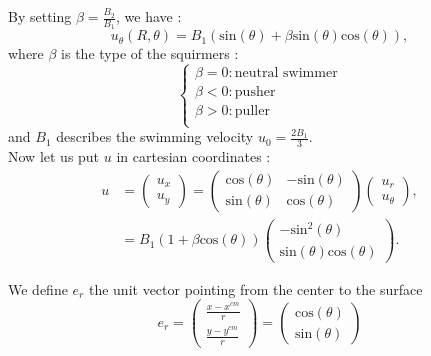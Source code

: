 \documentclass[options]{article}
\begin{document}
By setting $\beta=\frac{B_2}{B_1}$, we have :
$$
u_\theta(R,\theta) = B_1(\mathrm{sin}(\theta) + \beta \mathrm{sin}(\theta)\mathrm{cos}(\theta)),
$$
where $\beta$ is the type of the squirmers :
$$\left\{
    \begin{array}{ll}
        \beta = 0 : \text{neutral swimmer}  \\
        \beta < 0 : \mathrm{pusher} \\
        \beta > 0 : \mathrm{puller} \\
    \end{array}
\right.$$
and $B_1$ describes the swimming velocity $u_0 = \frac{2 B_1}{3}$.
\\ Now let us put $u$ in cartesian coordinates :
\begin{align*}
    u &= \begin{pmatrix}
   u_x \\
   u_y
\end{pmatrix}
= \begin{pmatrix}
   \mathrm{cos}(\theta) & -\mathrm{sin}(\theta) \\
   \mathrm{sin}(\theta) & \mathrm{cos}(\theta)
\end{pmatrix}
\begin{pmatrix}
   u_r \\
   u_\theta
\end{pmatrix}, \\
&= B_1 (1 + \beta \mathrm{cos}(\theta))
\begin{pmatrix}
   -\mathrm{sin}^2(\theta) \\
   \mathrm{sin}(\theta)\mathrm{cos}(\theta)
\end{pmatrix}.
\end{align*}

We define $e_r$ the unit vector pointing from the center to the surface 
$$
e_r = \begin{pmatrix}
   \frac{x - x^{cm}}{r}  \\
   \frac{y - y^{cm}}{r} 
\end{pmatrix} = \begin{pmatrix}
   \mathrm{cos}(\theta) \\
   \mathrm{sin}(\theta)
\end{pmatrix}$$ 
\end{document}
